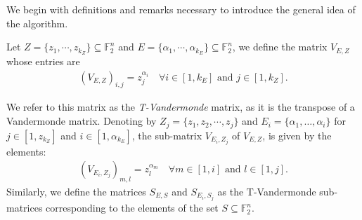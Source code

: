 \documentclass[11pt]{llncs}
\begin{document}
We begin with definitions and remarks necessary to introduce the general idea of the algorithm.




\begin{definition}\label{def:tVandermonde}
    Let $Z = \{z_1, \cdots, z_{k_Z}\} \subseteq \mathbb{F}_2^n$ and $E = \{\alpha_1, \cdots, \alpha_{k_E}\}\subseteq \mathbb{F}_2^n$, we define the matrix $V_{E,Z}$ whose entries are
    \begin{align*}
        \left(V_{E,Z}\right)_{i,j} = z_j^{\alpha_i} \quad \forall i\in[1,k_E] \mbox{ and } j\in[1, k_Z].
    \end{align*}
    
  We refer to this matrix as the \textit{T-Vandermonde} matrix, as it is the transpose of a Vandermonde matrix.
    Denoting by $Z_j = \{z_1, z_2, \cdots, z_j\}$ and $E_i = \{\alpha_1, \dots, \alpha_i\}$ for $j\in[1,z_{k_Z}]$ and $i\in[1,\alpha_{k_E}]$, the sub-matrix $V_{E_i, Z_j}$ of $V_{E,Z}$, is given by the elements:
    \begin{align*}
        \left(V_{E_i,Z_j}\right)_{m,l} = z_l^{\alpha_m} \quad \forall m\in[1,i] \mbox{ and } l\in[1, j].
    \end{align*}
    Similarly, we define the matrices $S_{E,S}$ and $S_{E_i, S_j}$ as the T-Vandermonde sub-matrices corresponding to the elements of the set $S\subseteq \mathbb{F}_2^n$.
\end{definition}
\end{document}
